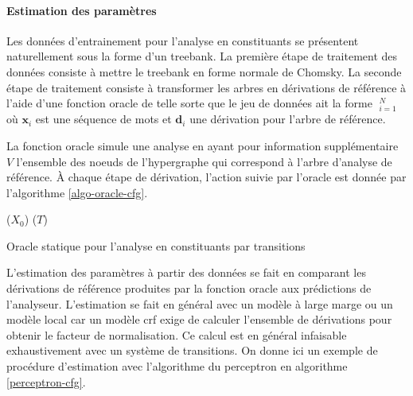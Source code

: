 \documentclass[11pt,openany]{book}
\begin{document}
\paragraph{Estimation des paramètres} Les données d'entrainement pour l'analyse en constituants se présentent
naturellement sous la forme d'un treebank. La première étape de traitement des données consiste à 
mettre le treebank en forme normale de Chomsky. 
La seconde étape de traitement consiste à transformer les arbres en dérivations de référence à l'aide d'une fonction oracle
de telle sorte que le jeu de données ait la forme $\mathop{(\mathbf{x}_i,\mathbf{d}_i)}_{i=1}^N$ où $\mathbf{x}_i$ est une séquence de mots
et $\mathbf{d}_i$ une dérivation pour l'arbre de référence.

La fonction oracle simule une analyse en ayant pour information supplémentaire $V$ l'ensemble des noeuds de l'hypergraphe qui 
correspond à l'arbre d'analyse de référence. \`A chaque étape de dérivation, l'action suivie par l'oracle est donnée par l'algorithme \ref{algo-oracle-cfg}.
\begin{algorithm}
\begin{algorithmic}
 
        \State {}($X_0$)
\EndIf
\EndIf
{} 
        \State {}($T$)
\EndIf
\EndIf
\EndFunction
\end{algorithmic}
\caption{\label{algo-oracle-cfg}Oracle statique pour l'analyse en constituants par transitions }
\end{algorithm}

L'estimation des paramètres à partir des données se fait en comparant les dérivations de référence produites par la fonction oracle
aux prédictions de l'analyseur. 
L'estimation se fait en général avec un modèle à large marge ou un modèle local car un modèle {\sc crf}  
exige de calculer l'ensemble de dérivations pour obtenir le facteur de normalisation. Ce calcul est en général infaisable exhaustivement avec un système 
de transitions.  On donne ici un exemple de procédure d'estimation avec l'algorithme du perceptron 
en algorithme \ref{perceptron-cfg}.
\end{document}
